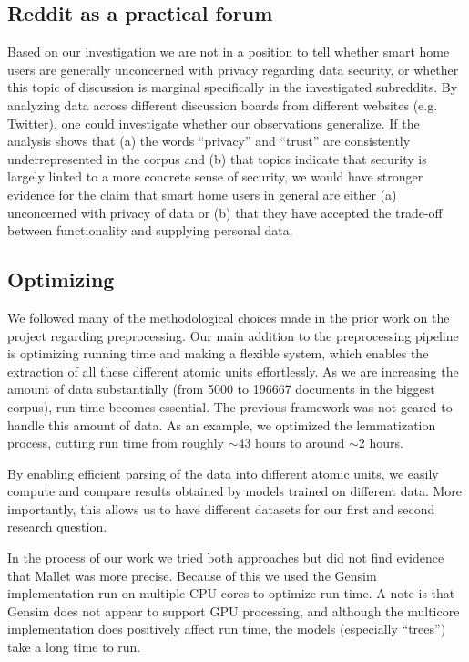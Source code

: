 \documentclass{article}
\begin{document}
    \subsection{Reddit as a practical forum}
    Based on our investigation we are not in a position to tell whether smart home users are generally unconcerned with privacy regarding data security, or whether this topic of discussion is marginal specifically in the investigated subreddits. By analyzing data across different discussion boards from different websites (e.g. Twitter), one could investigate whether our observations generalize. If the analysis shows that (a) the words “privacy” and “trust” are consistently underrepresented in the corpus and (b) that topics indicate that security is largely linked to a more concrete sense of security, we would have stronger evidence for the claim that smart home users in general are either (a) unconcerned with privacy of data or (b) that they have accepted the trade-off between functionality and supplying personal data. 
    \subsection{Optimizing}
    We followed many of the methodological choices made in the prior work on the project regarding preprocessing. Our main addition to the preprocessing pipeline is optimizing running time and making a flexible system, which enables the extraction of all these different atomic units effortlessly. As we are increasing the amount of data substantially (from 5000 to 196667 documents in the biggest corpus), run time becomes essential. The previous framework was not geared to handle this amount of data. As an example, we optimized the lemmatization process, cutting run time from roughly $\sim$43 hours to around $\sim$2 hours. 

By enabling efficient parsing of the data into different atomic units, we easily compute and compare results obtained by models trained on different data. More importantly, this allows us to have different datasets for our first and second research question. 

In the process of our work we tried both approaches but did not find evidence that Mallet was more precise. Because of this we used the Gensim implementation run on multiple CPU cores to optimize run time. A note is that Gensim does not appear to support GPU processing, and although the multicore implementation does positively affect run time, the models (especially “trees”) take a long time to run.    
\end{document}
